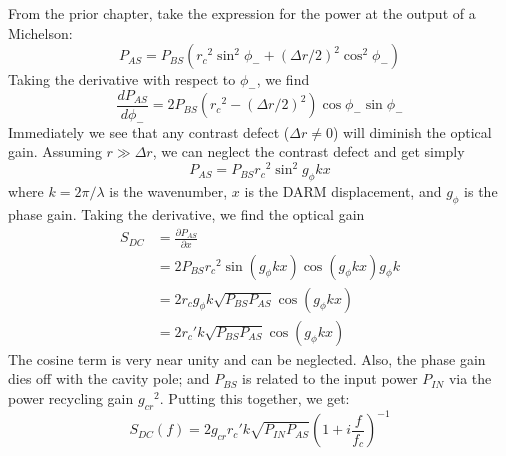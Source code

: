 From the prior chapter, take the expression for the power at the
output of a Michelson:
\begin{equation}
P_{AS} = P_{BS}\left({r_c}^2 \sin^2 \phi_- + (\Delta r/2)^2 \cos^2 \phi_-\right)
\end{equation}
Taking the derivative with respect to $\phi_-$, we find
\begin{equation}
\frac{d P_{AS}}{d \phi_-} = 2 P_{BS}\left({r_c}^2 - {(\Delta r/2)}^2\right)\cos\phi_- \sin\phi_-
\end{equation}
Immediately we see that any contrast defect ($\Delta r \neq 0$) will diminish the optical gain.  Assuming $r \gg \Delta r$, we can neglect the contrast defect and get simply
\begin{equation}
P_{AS} = P_{BS} {r_c}^2 \sin^2 g_\phi k x
\end{equation}
where $k=2\pi/\lambda$ is the wavenumber, $x$ is the DARM displacement, and $g_\phi$ is the phase gain.
Taking the derivative, we find the optical gain
\begin{align}
S_{DC}  & = \frac{\partial P_{AS}}{\partial x}  \\
       & = 2 P_{BS} {r_c}^2 \sin (g_\phi k x) \cos(g_\phi k x) g_\phi k \\
       & = 2 r_c g_\phi k \sqrt{P_{BS} P_{AS}} \cos(g_\phi k x) \\
       & = 2 {r_c}' k \sqrt{P_{BS} P_{AS}} \cos(g_\phi k x) 
\end{align}
The cosine term is very near unity and can be neglected.  Also, the
phase gain dies off with the cavity pole; and $P_{BS}$ is related to
the input power $P_{IN}$ via the power recycling gain ${g_{cr}}^2$.
Putting this together, we get:
\begin{equation}
\boxed{S_{DC}(f) = 2 g_{cr} {r_c}' k \sqrt{P_{IN} P_{AS}} \left(1 + i\frac{f}{f_c}\right)^{-1}}
\end{equation}


